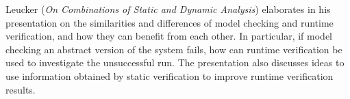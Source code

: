 

Leucker
\cite{isola-2016-leucker}
({\em On Combinations of Static and Dynamic Analysis})
elaborates in his presentation on the similarities and differences of
model checking and runtime verification, and how they can benefit
from each other. In particular, if model checking an abstract
version of the system fails, how can runtime verification be used to
investigate the unsuccessful run. The presentation also discusses ideas
to use information obtained by static verification to improve runtime
verification results.